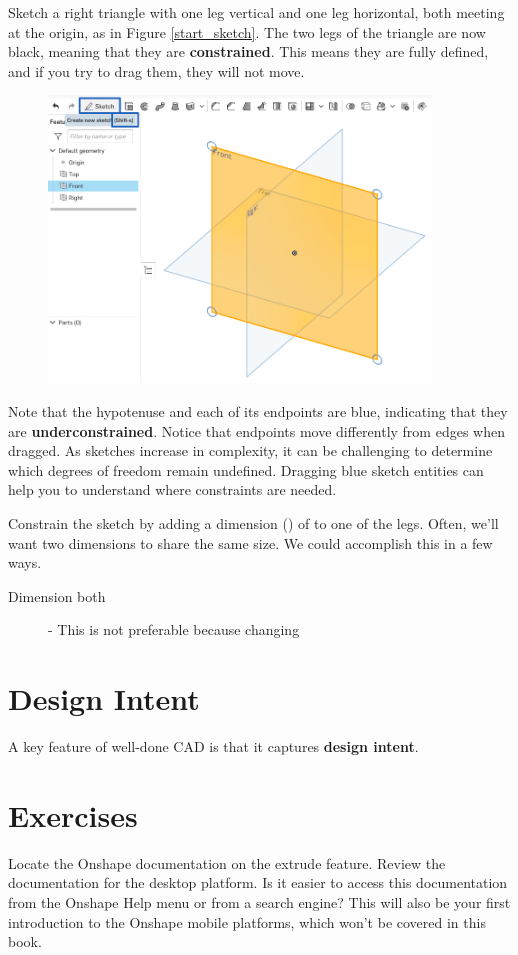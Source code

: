 Sketch a right triangle with one leg vertical and one leg horizontal, both meeting at the origin, as in Figure \ref{start_sketch}. The two legs of the triangle are now black, meaning that they are {\bf constrained}. This means they are fully defined, and if you try to drag them, they will not move.

\begin{figure}[ht!]
\centerline{\includegraphics[width=4in]{figs/chap01_start_sketch.png}}
\caption{}
\label{}
\end{figure}

Note that the hypotenuse and each of its endpoints are blue, indicating that they are {\bf underconstrained}. Notice that endpoints move differently from edges when dragged. As sketches increase in complexity, it can be challenging to determine which degrees of freedom remain undefined. Dragging blue sketch entities can help you to understand where constraints are needed.

Constrain the sketch by adding a dimension () of to one of the legs. Often, we'll want two dimensions to share the same size. We could accomplish this in a few ways.

\begin{description}
\item[Dimension both] - This is not preferable because changing
\end{description}

\section{Design Intent}
A key feature of well-done CAD is that it captures {\bf design intent}.

\section{Exercises}
\begin{exercise}
Locate the Onshape documentation on the extrude feature. Review the documentation for the desktop platform. Is it easier to access this documentation from the Onshape Help menu or from a search engine?
This will also be your first introduction to the Onshape mobile platforms, which won't be covered in this book.
\end{exercise}

